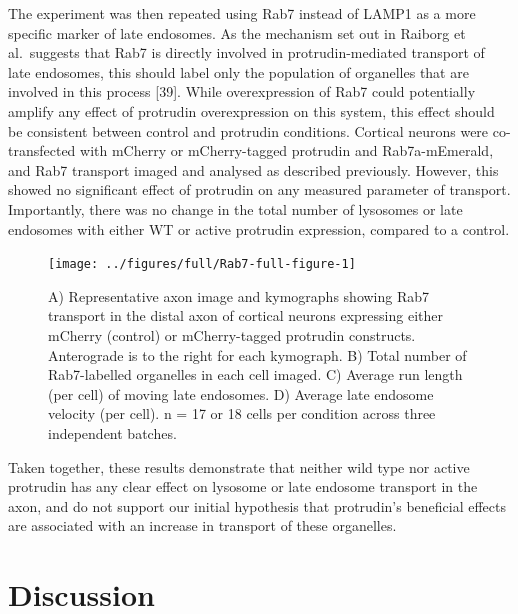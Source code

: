 \documentclass[
  12pt,
  a4paper,
]{book}
\begin{document}
The experiment was then repeated using Rab7 instead of LAMP1 as a more specific marker of late endosomes. As the mechanism set out in Raiborg et al.~suggests that Rab7 is directly involved in protrudin-mediated transport of late endosomes, this should label only the population of organelles that are involved in this process {[}39{]}. While overexpression of Rab7 could potentially amplify any effect of protrudin overexpression on this system, this effect should be consistent between control and protrudin conditions. Cortical neurons were co-transfected with mCherry or mCherry-tagged protrudin and Rab7a-mEmerald, and Rab7 transport imaged and analysed as described previously. However, this showed no significant effect of protrudin on any measured parameter of transport. Importantly, there was no change in the total number of lysosomes or late endosomes with either WT or active protrudin expression, compared to a control.

\begin{figure}
\texttt{[image: ../figures/full/Rab7-full-figure-1]} \caption[Protrudin effect on late endosome (Rab7) transport in the distal axon]{A) Representative axon image and kymographs showing Rab7 transport in the distal axon of cortical neurons expressing either mCherry (control) or mCherry-tagged protrudin constructs.  Anterograde is to the right for each kymograph.  B) Total number of Rab7-labelled organelles in each cell imaged.  C) Average run length (per cell) of moving late endosomes.  D) Average late endosome velocity (per cell).  n = 17 or 18 cells per condition across three independent batches.}\label{fig:Rab7-full-figure}
\end{figure}

Taken together, these results demonstrate that neither wild type nor active protrudin has any clear effect on lysosome or late endosome transport in the axon, and do not support our initial hypothesis that protrudin's beneficial effects are associated with an increase in transport of these organelles.

\hypertarget{no-FYCO}{%
\section{Discussion}\label{no-FYCO}}
\end{document}
